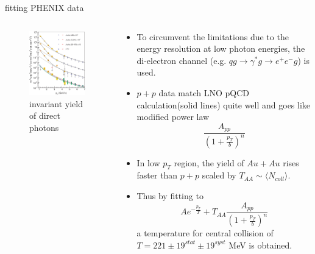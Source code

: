 \documentclass{beamer}
\begin{document}
\begin{frame}{fitting PHENIX data}
  \begin{columns}
    \begin{column}{.4\textwidth}
    \begin{figure}
      \includegraphics[width=\textwidth]{plots/direct_photon_spectrum.pdf}
      \caption{invariant yield of direct photons}    
    \end{figure}
    \end{column}
    \begin{column}{.6\textwidth}
      \scriptsize
      \begin{itemize}
        \item To circumvent the limitations due to the energy resolution at low photon energies, the di-electron channel (e.g. $qg\rightarrow \gamma^*g\rightarrow e^+e^-g$) is used.
        \item $p+p$ data match LNO pQCD calculation(solid lines) quite well and goes like modified power law
        \begin{equation}
				\frac{A_{pp}}{\left( 1+\frac{p_T}{b} \right)^n}
				\end{equation}
				\item In low $p_T$ region, the yield of $Au+Au$ rises faster than $p+p$ scaled by $T_{AA}\sim \langle N_{coll}\rangle$.
				\item Thus by fitting to
				\begin{equation}
				Ae^{-\frac{p_T}{T}}+T_{AA}\frac{A_{pp}}{\left( 1+\frac{p_T}{b} \right)^n}
				\end{equation}
				a temperature for central collision of $T=221\pm 19^{stat} \pm 19^{syst}$ MeV is obtained.
      \end{itemize}
    \end{column}
  \end{columns}
\end{frame}
\end{document}
